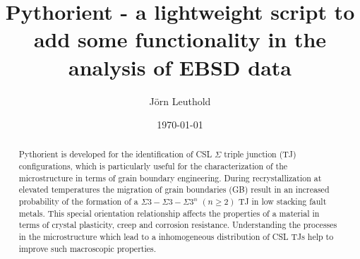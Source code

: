 \documentclass{article}
\title{Pythorient - a lightweight script to add some functionality in the analysis of EBSD data}
\author{J\"orn Leuthold}
\date{\today}
\begin{document}
\maketitle


\begin{abstract}
Pythorient is developed for the identification of CSL $\Sigma$ triple junction (TJ) configurations, which is particularly useful for the characterization of the microstructure in terms of grain boundary engineering. During recrystallization at elevated temperatures the migration of grain boundaries (GB) result in an increased probability of the formation of a $\Sigma3-\Sigma3-\Sigma3^n$ $(n \geq 2)$ TJ in low stacking fault metals. This special orientation relationship affects the properties of a material in terms of crystal plasticity, creep and corrosion resistance. Understanding the processes in the microstructure which lead to a inhomogeneous distribution of CSL TJs help to improve such macroscopic properties. 


\end{abstract}
\end{document}
